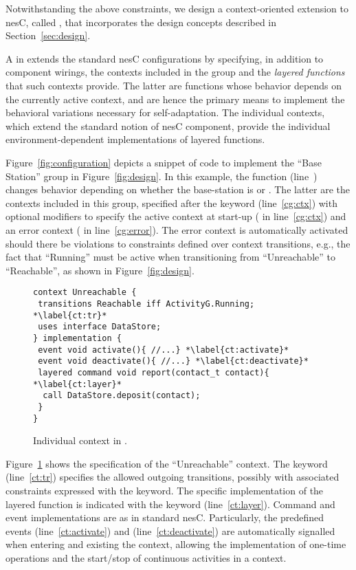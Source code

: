 \fakepar{\conesc} Notwithstanding the above constraints, we design a
context-oriented extension to nesC, called \conesc, that incorporates
the design concepts described in Section~\ref{sec:design}.

A  in \conesc extends the standard nesC
configurations by specifying, in addition to component wirings, the
contexts included in the group and the \emph{layered
  functions}~\cite{cop} that such contexts provide. The latter are
functions whose behavior depends on the currently active context, and
are hence the primary means to implement the behavioral variations
necessary for self-adaptation. The individual contexts, which extend
the standard notion of nesC component, provide the individual
environment-dependent implementations of layered functions.

Figure~\ref{fig:configuration} depicts a snippet of \conesc code to
implement the ``Base Station'' group in Figure~\ref{fig:design}. In
this example, the  function (line~)
changes behavior depending on whether the base-station is
 or . The latter are the contexts
included in this group, specified after the keyword 
(line~\ref{cg:ctx}) with optional modifiers to specify the active
context at start-up ( in line~\ref{cg:ctx}) and an
error context ( in line~\ref{cg:error}). The error
context is automatically activated should there be violations to
constraints defined over context transitions, e.g., the fact that
``Running'' must be active when transitioning from
``Unreachable'' to ``Reachable'', as shown in Figure~\ref{fig:design}.

\begin{figure}[!tb]
\begin{lstlisting}[style=conescframe]
context Unreachable {
 transitions Reachable iff ActivityG.Running; *\label{ct:tr}*
 uses interface DataStore;
} implementation {
 event void activate(){ //...} *\label{ct:activate}*
 event void deactivate(){ //...} *\label{ct:deactivate}*
 layered command void report(contact_t contact){ *\label{ct:layer}*
  call DataStore.deposit(contact);
 }
}
\end{lstlisting}
\vspace{-4mm}
\caption{Individual context in \conesc.}
  \label{fig:context}
\vspace{-2mm}
\end{figure}

Figure~\ref{fig:context} shows the \conesc specification of the
``Unreachable'' context. The keyword 
(line~\ref{ct:tr}) specifies the allowed outgoing transitions,
possibly with associated constraints expressed with the 
keyword. The specific implementation of the layered function is
indicated with the  keyword
(line~\ref{ct:layer}). Command and event implementations are as in
standard nesC. Particularly, the predefined events 
(line~\ref{ct:activate}) and 
(line~\ref{ct:deactivate}) are automatically signalled when entering
and existing the context, allowing the implementation of one-time
operations and the start/stop of continuous activities in a context.

